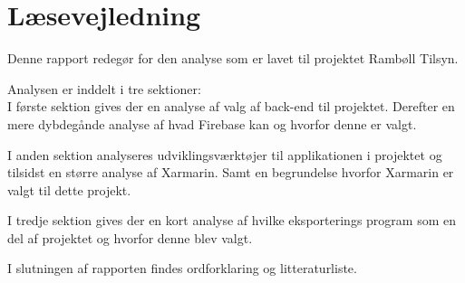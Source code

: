 \chapter*{Læsevejledning}
Denne rapport redegør for den analyse som er lavet til projektet Rambøll Tilsyn. 

Analysen er inddelt i tre sektioner:\\
I første sektion gives der en analyse af valg af back-end til projektet. Derefter en mere dybdegånde analyse af hvad Firebase kan og hvorfor denne er valgt.

I anden sektion analyseres udviklingsværktøjer til applikationen i projektet og tilsidst en større analyse af Xarmarin. Samt en begrundelse hvorfor Xarmarin er valgt til dette projekt.

I tredje sektion gives der en kort analyse af hvilke eksporterings program som en del af projektet og hvorfor denne blev valgt.

I slutningen af rapporten findes ordforklaring og litteraturliste.
